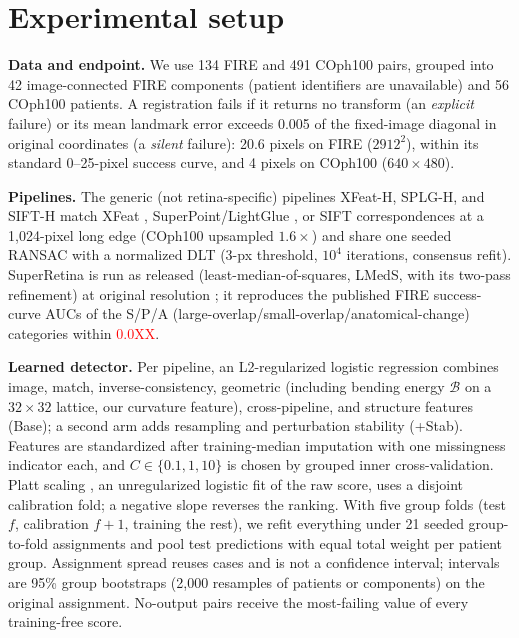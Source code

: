 \documentclass{article}
\newcommand{\pend}[1]{\textcolor{red}{#1}\typeout{PENDING VALUE: #1}}
\providecommand{\numSrFireDiff}{\pend{0.0XX}}
\newcommand{\xf}{XFeat-H}
\newcommand{\splg}{SPLG-H}
\newcommand{\sift}{SIFT-H}
\newcommand{\sr}{SuperRetina}
\begin{document}
\section{Experimental setup}
\label{sec:setup}

\textbf{Data and endpoint.} We use 134 FIRE \cite{fire} and 491 COph100
\cite{coph} pairs, grouped into 42 image-connected FIRE components (patient
identifiers are unavailable) and 56 COph100 patients. A registration fails if
it returns no transform (an \emph{explicit} failure) or its mean landmark
error exceeds 0.005 of the fixed-image diagonal in original coordinates (a
\emph{silent} failure): 20.6 pixels on FIRE ($2912^2$), within its standard
0--25-pixel success curve, and 4 pixels on COph100 ($640\times480$).

\textbf{Pipelines.} The generic (not retina-specific) pipelines \xf{},
\splg{}, and \sift{} match XFeat \cite{xfeat},
SuperPoint/LightGlue \cite{lightglue}, or SIFT \cite{sift} correspondences at
a 1,024-pixel long edge (COph100 upsampled $1.6\times$) and share one seeded
RANSAC with a normalized DLT (3-px threshold, $10^4$ iterations, consensus
refit). \sr{} is run as released (least-median-of-squares, LMedS, with its two-pass
refinement) at
original resolution \cite{superretina}; it reproduces the published FIRE
success-curve AUCs of the S/P/A (large-overlap/small-overlap/anatomical-change)
categories within \numSrFireDiff.

\textbf{Learned detector.} Per pipeline, an L2-regularized logistic
regression combines image, match, inverse-consistency, geometric (including
bending energy $\mathcal{B}$ on a $32\times32$ lattice, our curvature
feature), cross-pipeline, and structure features (Base); a second arm adds
resampling and perturbation stability (+Stab). Features are standardized
after training-median imputation with one missingness indicator each, and
$C\in\{0.1,1,10\}$ is chosen by grouped inner cross-validation. Platt scaling
\cite{platt}, an unregularized logistic fit of the raw score, uses a disjoint
calibration fold; a negative slope reverses the ranking. With five group
folds (test $f$, calibration $f{+}1$, training the rest), we refit everything
under 21 seeded group-to-fold assignments and pool test predictions with
equal total weight per patient group. Assignment spread reuses cases and is
not a confidence interval; intervals are 95\% group bootstraps (2,000
resamples of patients or components) on the original assignment. No-output
pairs receive the most-failing value of every training-free score.
\end{document}
